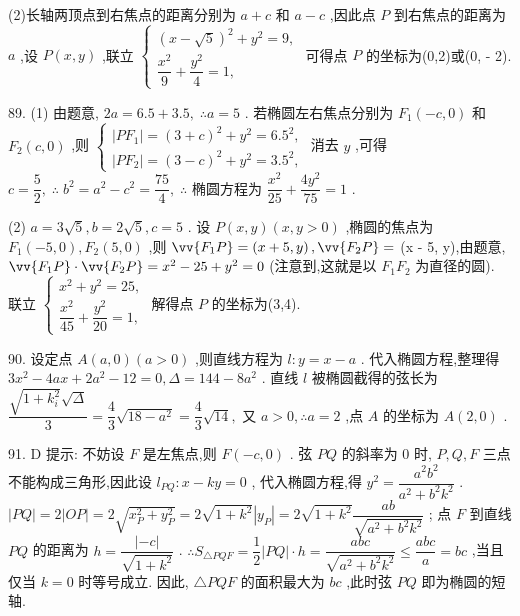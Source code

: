 (2)长轴两顶点到右焦点的距离分别为 $a + c$ 和 $a - c$ ,因此点 $P$ 到右焦点的距离为 $a$ ,设 $P\left( {x,y}\right)$ ,联立 $\left\{  \begin{array}{l} {\left( x - \sqrt{5}\right) }^{2} + {y}^{2} = 9, \\  \dfrac{{x}^{2}}{9} + \dfrac{{y}^{2}}{4} = 1, \end{array}\right.$ 可得点 $P$ 的坐标为(0,2)或(0, - 2).

89. (1) 由题意, ${2a} = {6.5} + {3.5},\;\therefore a = 5$ . 若椭圆左右焦点分别为 ${F}_{1}\left( {-c,0}\right)$ 和 ${F}_{2}\left( {c,0}\right)$ ,则 $\left\{  \begin{array}{l} \left| {P{F}_{1}}\right|  = {\left( 3 + c\right) }^{2} + {y}^{2} = {6.5}^{2}, \\  \left| {P{F}_{2}}\right|  = {\left( 3 - c\right) }^{2} + {y}^{2} = {3.5}^{2}, \end{array}\right.$ 消去 $y$ ,可得 $c = \dfrac{5}{2},\;\therefore \;{b}^{2} = {a}^{2} - {c}^{2} = \dfrac{75}{4},\;\therefore$ 椭圆方程为 $\dfrac{{x}^{2}}{25} + \dfrac{4{y}^{2}}{75} = 1$ .

(2) $a = 3\sqrt{5},b = 2\sqrt{5},c = 5$ . 设 $P\left( {x,y}\right) \left( {x,y > 0}\right)$ ,椭圆的焦点为 ${F}_{1}\left( {-5,0}\right) ,{F}_{2}\left( {5,0}\right)$ ,则 $\vv{{F}_{1}P} = \left( {x + 5,y}\right) ,\vv{{F}_{2}P} =$ (x - 5, y),由题意, $\vv{{F}_{1}P} \cdot  \vv{{F}_{2}P} = {x}^{2} - {25} + {y}^{2} = 0$ (注意到,这就是以 ${F}_{1}{F}_{2}$ 为直径的圆). 联立 $\left\{  \begin{array}{l} {x}^{2} + {y}^{2} = {25}, \\  \dfrac{{x}^{2}}{45} + \dfrac{{y}^{2}}{20} = 1, \end{array}\right.$ 解得点 $P$ 的坐标为(3,4).

90. 设定点 $A\left( {a,0}\right) \left( {a > 0}\right)$ ,则直线方程为 $l : y = x - a$ . 代入椭圆方程,整理得 $3{x}^{2} - {4ax} + 2{a}^{2} - {12} = 0,\Delta  = {144} - 8{a}^{2}$ . 直线 $l$ 被椭圆截得的弦长为 $\dfrac{\sqrt{1 + {k}_{i}^{2}}\sqrt{\Delta }}{3} = \dfrac{4}{3}\sqrt{{18} - {a}^{2}} = \dfrac{4}{3}\sqrt{14},$ 又 $a > 0,\therefore a = 2$ ,点 $A$ 的坐标为 $A\left( {2,0}\right)$ .

91. D 提示: 不妨设 $F$ 是左焦点,则 $F\left( {-c,0}\right)$ . 弦 ${PQ}$ 的斜率为 0 时, $P,Q,F$ 三点不能构成三角形,因此设 ${l}_{PQ} : x - {ky} = 0$ , 代入椭圆方程,得 ${y}^{2} = \dfrac{{a}^{2}{b}^{2}}{{a}^{2} + {b}^{2}{k}^{2}}$ . $\left| {PQ}\right|  = 2\left| {OP}\right|  = 2\sqrt{{x}_{P}^{2} + {y}_{P}^{2}} = 2\sqrt{1 + {k}^{2}}\left| {y}_{P}\right|  = 2\sqrt{1 + {k}^{2}}\dfrac{ab}{\sqrt{{a}^{2} + {b}^{2}{k}^{2}}}$ ; 点 $F$ 到直线 ${PQ}$ 的距离为 $h = \dfrac{\left| -c\right| }{\sqrt{1 + {k}^{2}}}$ . $\therefore {S}_{\bigtriangleup {PQF}} = \dfrac{1}{2}\left| {PQ}\right|  \cdot  h = \dfrac{abc}{\sqrt{{a}^{2} + {b}^{2}{k}^{2}}} \leq  \dfrac{abc}{a} = {bc}$ ,当且仅当 $k = 0$ 时等号成立. 因此, $\bigtriangleup {PQF}$ 的面积最大为 ${bc}$ ,此时弦 ${PQ}$ 即为椭圆的短轴.

